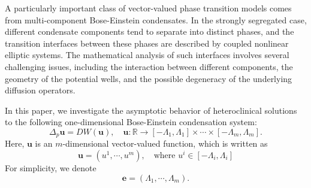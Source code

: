 \documentclass[11pt,twoside,reqno]{amsart}
\numberwithin{equation}{section}
\begin{document}
A particularly important class of vector-valued phase transition models comes from multi-component Bose-Einstein condensates. In the strongly segregated case, different condensate components tend to separate into distinct phases, and the transition interfaces between these phases are described by coupled nonlinear elliptic systems. The mathematical analysis of such interfaces involves several challenging issues, including the interaction between different components, the geometry of the potential wells, and the possible degeneracy of the underlying diffusion operators.

In this paper, we investigate the asymptotic behavior of heteroclinical solutions to the following one-dimensional Bose-Einstein condensation system:
\begin{equation*}
    \Delta_{p}\mathbf{u}=DW(\mathbf{u}),\quad\mathbf{u}:\mathbb{R}\to[-\Lambda_{1},\Lambda_{1}]\times\cdots\times[-\Lambda_{m},\Lambda_{m}].
\end{equation*}
Here, $\mathbf{u}$ is an $m$-dimensional vector-valued function, which is written as
\begin{equation*}
    \mathbf{u}=(u^{1},\cdots,u^{m}),\quad\mbox{where }u^{i}\in[-\Lambda_{i},\Lambda_{i}]
\end{equation*}
For simplicity, we denote
\begin{equation*}
    \mathbf{e}=(\Lambda_{1},\cdots,\Lambda_{m}).
\end{equation*}
\end{document}
